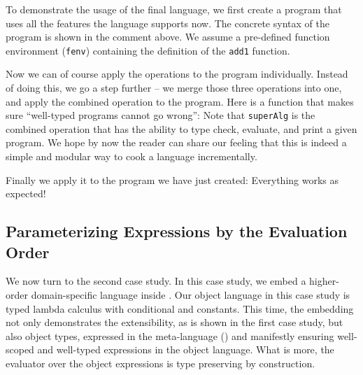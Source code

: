 
To demonstrate the usage of the final language, we first create a program that
uses all the features the language supports now.
The concrete syntax of the program is shown in the comment above. We assume a
pre-defined function environment (\lstinline{fenv}) containing the definition of
the \lstinline{add1} function.

Now we can of course apply the operations to the program individually. Instead
of doing this, we go a step further -- we merge those three operations into one,
and apply the combined operation to the program. Here is a function that makes
sure ``well-typed programs cannot go wrong'':
Note that \lstinline{superAlg} is the combined operation that has the ability to
type check, evaluate, and print a given program. We hope by now the reader can
share our feeling that this is indeed a simple and modular way to cook a
language incrementally.

Finally we apply it to the program we have just created:
Everything works as expected!


\subsection{Parameterizing Expressions by the Evaluation Order}

We now turn to the second case study. In this case study, we embed a
higher-order domain-specific language inside \name. Our object language in this
case study is typed lambda calculus with conditional and constants. This time,
the embedding not only demonstrates the extensibility, as is shown in the first
case study, but also object types, expressed in the meta-language (\name) and
manifestly ensuring well-scoped and well-typed expressions in the object
language. What is more, the evaluator over the object expressions is type
preserving by construction.

